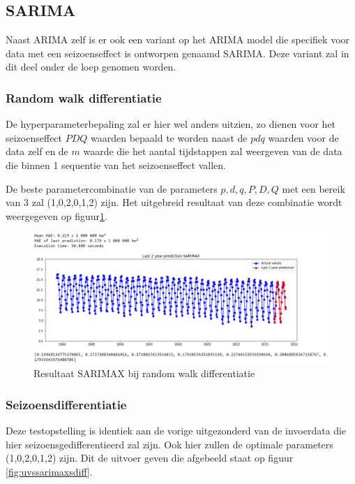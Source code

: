 \subsection{SARIMA}

Naast ARIMA zelf is er ook een variant op het ARIMA model die specifiek voor data met een seizoenseffect is ontworpen genaamd SARIMA. Deze variant zal in dit deel onder de loep genomen worden.

\subsubsection{Random walk differentiatie} 

De hyperparameterbepaling zal er hier wel anders uitzien, zo dienen voor het seizoenseffect $PDQ$ waarden bepaald te worden naast de $pdq$ waarden voor de data zelf en de $m$ waarde die het aantal tijdstappen zal weergeven van de data die binnen 1 sequentie van het seizoenseffect vallen.

De beste parametercombinatie van de parameters $p, d, q, P, D, Q$ met een bereik van 3 zal (1,0,2,0,1,2) zijn. Het uitgebreid resultaat van deze combinatie wordt weergegeven op figuur\ref{fig:uvssarimaxdiff}.

\begin{figure}
    \centering
    \caption{Resultaat SARIMAX bij random walk differentiatie}
    \label{fig:uvssarimaxdiff}
    \includegraphics[width=1\linewidth]{uv_s_sarimax_diff}
\end{figure}


\subsubsection{Seizoensdifferentiatie}

Deze testopstelling is identiek aan de vorige uitgezonderd van de invoerdata die hier seizoensgedifferentieerd zal zijn. Ook hier zullen de optimale parameters (1,0,2,0,1,2) zijn. Dit de uitvoer geven die afgebeeld staat op figuur \ref{fig:uvssarimaxsdiff}.

